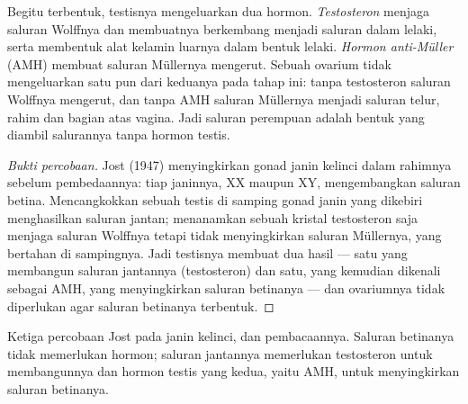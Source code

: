 \begin{proposition}\label{prop:g11:becoming-male-female:hormones}
Begitu terbentuk, testisnya mengeluarkan dua hormon.
\emph{Testosteron} menjaga saluran Wolffnya dan
membuatnya berkembang menjadi saluran dalam lelaki, serta membentuk
alat kelamin luarnya dalam bentuk lelaki. \emph{Hormon anti-Müller}
(AMH) membuat saluran Müllernya mengerut. Sebuah ovarium tidak
mengeluarkan satu pun dari keduanya pada tahap ini: tanpa testosteron
saluran Wolffnya mengerut, dan tanpa AMH saluran Müllernya menjadi
saluran telur, rahim dan bagian atas vagina. Jadi saluran perempuan
adalah bentuk yang diambil salurannya tanpa hormon testis.
\end{proposition}
\begin{proof}[Bukti percobaan]
Jost (1947) menyingkirkan gonad janin kelinci dalam rahimnya sebelum
pembedaannya: tiap janinnya, XX maupun XY, mengembangkan saluran
betina. Mencangkokkan sebuah testis di samping gonad janin yang
dikebiri menghasilkan saluran jantan; menanamkan sebuah kristal
testosteron saja menjaga saluran Wolffnya tetapi tidak menyingkirkan
saluran Müllernya, yang bertahan di sampingnya. Jadi testisnya membuat
dua hasil --- satu yang membangun saluran jantannya (testosteron) dan
satu, yang kemudian dikenali sebagai AMH, yang menyingkirkan saluran
betinanya --- dan ovariumnya tidak diperlukan agar saluran betinanya
terbentuk.
\end{proof}

\begin{omfigure}

{\small Ketiga percobaan Jost pada janin kelinci, dan pembacaannya.
Saluran betinanya tidak memerlukan hormon; saluran jantannya
memerlukan testosteron untuk membangunnya dan hormon testis yang kedua,
yaitu AMH, untuk menyingkirkan saluran betinanya.}
\end{omfigure}

